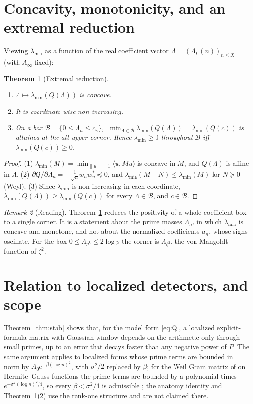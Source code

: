 \documentclass[11pt]{amsart}
\newtheorem{theorem}{Theorem}[section]
\theoremstyle{definition}
\theoremstyle{remark}
\newtheorem{remark}[theorem]{Remark}
\newcommand{\lmin}{\lambda_{\min}}
\newcommand{\Norm}[1]{\lVert #1\rVert}
\begin{document}
\section{Concavity, monotonicity, and an extremal reduction}\label{sec:concave}
Viewing $\lmin$ as a function of the real coefficient vector $\Lambda=(\Lambda_L(n))_{n\le X}$ (with
$A_\infty$ fixed):
\begin{theorem}[Extremal reduction]\label{thm:concave}
\begin{enumerate}[label=\textnormal{(\arabic*)}]
\item $\Lambda\mapsto\lmin(Q(\Lambda))$ is concave.
\item It is coordinate-wise non-increasing.
\item On a box $\mathcal B=\{0\le\Lambda_n\le c_n\}$, $\ \min_{\Lambda\in\mathcal B}\lmin(Q(\Lambda))=\lmin(Q(c))$
is attained at the all-upper corner. Hence $\lmin\ge0$ throughout $\mathcal B$ iff $\lmin(Q(c))\ge0$.
\end{enumerate}
\end{theorem}
\begin{proof}
(1) $\lmin(M)=\min_{\Norm u=1}\langle u,Mu\rangle$ is concave in $M$, and $Q(\Lambda)$ is affine in $\Lambda$.
(2) $\partial Q/\partial\Lambda_n=-\tfrac1{\sqrt n}w_nw_n^{*}\preceq0$, and $\lmin(M-N)\le\lmin(M)$ for $N\succeq0$
(Weyl). (3) Since $\lmin$ is non-increasing in each coordinate, $\lmin(Q(\Lambda))\ge\lmin(Q(c))$ for every
$\Lambda\in\mathcal B$, and $c\in\mathcal B$. \end{proof}

\begin{remark}[Reading]
Theorem~\ref{thm:concave} reduces the positivity of a whole coefficient box to a single corner. It is a
statement about the prime masses $\Lambda_n$, in which $\lmin$ is concave and monotone, and not about the
normalized coefficients $a_n$, whose signs oscillate. For the box $0\le\Lambda_{p^k}\le 2\log p$ the corner is
$\Lambda_{\zeta^2}$, the von Mangoldt function of $\zeta^2$.
\end{remark}

\section{Relation to localized detectors, and scope}\label{sec:scope}
Theorem~\ref{thm:stab} shows that, for the model form \eqref{eq:Q}, a localized explicit-formula matrix with
Gaussian window depends on the arithmetic only through small primes, up to an error that decays faster than any
negative power of $P$. The same argument applies to localized forms whose prime terms are bounded in norm by
$A_0e^{-\beta(\log n)^2}$, with $\sigma^2/2$ replaced by $\beta$; for the Weil Gram matrix of \cite{P7} on Hermite--Gauss functions the prime terms are bounded by a polynomial times $e^{-\sigma^2(\log n)^2/4}$, so every $\beta<\sigma^2/4$ is admissible \cite[truncation theorem]{P7}; the anatomy identity and Theorem~\ref{thm:concave}(2)
use the rank-one structure and are not claimed there.
\end{document}
